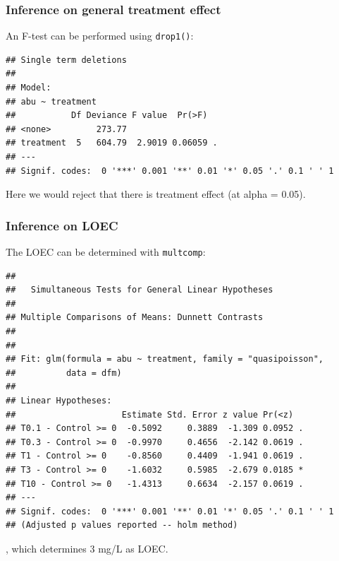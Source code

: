 \subsubsection{Inference on general treatment effect}
An F-test can be performed using \texttt{drop1()}:
\begin{knitrout}
\color{fgcolor}\small\begin{kframe}
\begin{alltt}
  \hlstd{=} \hlstd{)}
\end{alltt}
\begin{verbatim}
## Single term deletions
## 
## Model:
## abu ~ treatment
##           Df Deviance F value  Pr(>F)  
## <none>         273.77                  
## treatment  5   604.79  2.9019 0.06059 .
## ---
## Signif. codes:  0 '***' 0.001 '**' 0.01 '*' 0.05 '.' 0.1 ' ' 1
\end{verbatim}
\end{kframe}
\end{knitrout}
Here we would reject that there is treatment effect (at alpha = 0.05).

\subsubsection{Inference on LOEC}
The LOEC can be determined with \texttt{multcomp}:
\begin{knitrout}
\color{fgcolor}\small\begin{kframe}
\begin{alltt}
\hlstd{(}  \hlstd{=} \hlstd{(} \hlstd{=} \hlstd{),}
                 \hlstd{=} \hlstd{),}
                 \hlstd{=} \hlstd{(}\hlstd{))}
\end{alltt}
\begin{verbatim}
## 
## 	 Simultaneous Tests for General Linear Hypotheses
## 
## Multiple Comparisons of Means: Dunnett Contrasts
## 
## 
## Fit: glm(formula = abu ~ treatment, family = "quasipoisson", 
##          data = dfm)
## 
## Linear Hypotheses:
##                     Estimate Std. Error z value Pr(<z)  
## T0.1 - Control >= 0  -0.5092     0.3889  -1.309 0.0952 .
## T0.3 - Control >= 0  -0.9970     0.4656  -2.142 0.0619 .
## T1 - Control >= 0    -0.8560     0.4409  -1.941 0.0619 .
## T3 - Control >= 0    -1.6032     0.5985  -2.679 0.0185 *
## T10 - Control >= 0   -1.4313     0.6634  -2.157 0.0619 .
## ---
## Signif. codes:  0 '***' 0.001 '**' 0.01 '*' 0.05 '.' 0.1 ' ' 1
## (Adjusted p values reported -- holm method)
\end{verbatim}
\end{kframe}
\end{knitrout}
, which determines 3 mg/L as LOEC.



